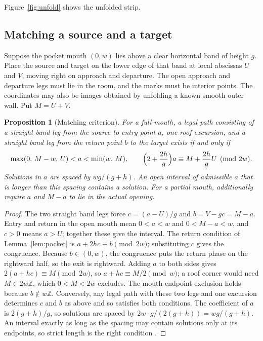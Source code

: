 \documentclass[11pt]{article}
\newtheorem{proposition}{Proposition}
\theoremstyle{definition}
\theoremstyle{remark}
\newcommand{\Z}{\mathbb Z}
\begin{document}
Figure~\ref{fig:unfold} shows the unfolded strip.

\subsection{Matching a source and a target}
Suppose the pocket mouth $(0,w)$ lies above a clear horizontal band of height
$g$. Place the source and target on the lower edge of that band at local
abscissas $U$ and $V$, moving right on approach and departure. The open approach
and departure legs must lie in the room, and the marks must be interior points.
The coordinates may also be images obtained by unfolding a known smooth outer
wall. Put $M=U+V$.

\begin{proposition}[Matching criterion]\label{prop:match}
For a full mouth, a legal path consisting of a straight band leg from the source
to entry point $a$, one roof excursion, and a straight band leg from the return
point $b$ to the target exists if and only if
\[
\max(0,\,M-w,\,U)<a<\min(w,\,M),\qquad
\Bigl(2+\frac{2h}{g}\Bigr)a\equiv M+\frac{2h}{g}U\pmod{2w}.
\]
Solutions in $a$ are spaced by $wg/(g+h)$. An open interval of admissible $a$
that is longer than this spacing contains a solution. For a partial mouth,
additionally require $a$ and $M-a$ to lie in the actual opening.
\end{proposition}

\begin{proof}
The two straight band legs force $c=(a-U)/g$ and $b=V-gc=M-a$. Entry and return
in the open mouth mean $0<a<w$ and $0<M-a<w$, and $c>0$ means $a>U$; together
these give the interval. The return condition of Lemma~\ref{lem:pocket} is
$a+2hc\equiv b\pmod{2w}$; substituting $c$ gives the congruence. Because
$b\in(0,w)$, the congruence puts the return phase on the rightward half, so the
exit is rightward. Adding $a$ to both sides gives $2(a+hc)\equiv M\pmod{2w}$, so
$a+hc\equiv M/2\pmod w$; a roof corner would need $M\in 2w\Z$, which
$0<M<2w$ excludes. The mouth-endpoint exclusion holds because $b\notin w\Z$.
Conversely, any legal path with these two legs and one excursion determines $c$
and $b$ as above and so satisfies both conditions. The coefficient of $a$ is
$2(g+h)/g$, so solutions are spaced by $2w\cdot g/(2(g+h))=wg/(g+h)$. An
interval exactly as long as the spacing may contain solutions only at its
endpoints, so strict length is the right condition \cite{R2,d201}.
\end{proof}
\end{document}
